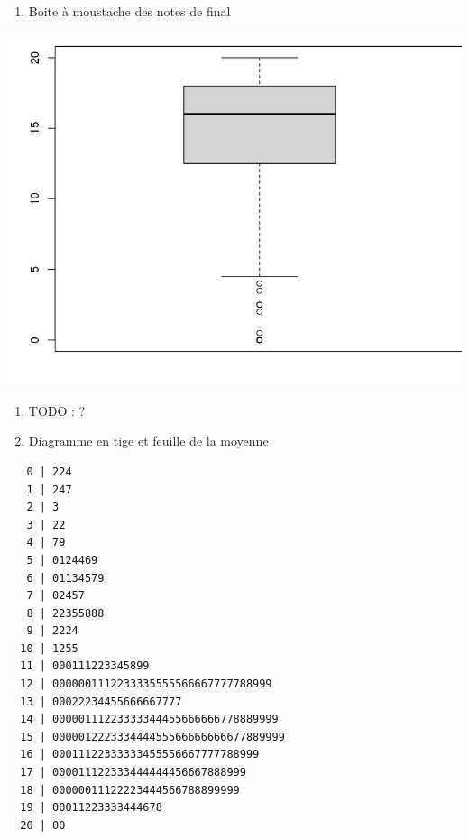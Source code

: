 \documentclass[
]{article}
\newenvironment{Shaded}{}{}
\newcommand{\KeywordTok}[1]{\textcolor[rgb]{0.00,0.44,0.13}{\textbf{#1}}}
\newcommand{\NormalTok}[1]{#1}
\newcommand{\OperatorTok}[1]{\textcolor[rgb]{0.40,0.40,0.40}{#1}}
\providecommand{\tightlist}{%
  \setlength{\itemsep}{0pt}\setlength{\parskip}{0pt}}
\begin{document}
\begin{enumerate}
\def\labelenumi{\arabic{enumi}.}
\setcounter{enumi}{21}
\tightlist
\item
  Boite à moustache des notes de final
\end{enumerate}

\begin{Shaded}
\end{Shaded}

\includegraphics{img/boxplot(final).png}

\begin{enumerate}
\def\labelenumi{\arabic{enumi}.}
\setcounter{enumi}{22}
\item
  TODO : ?
\item
  Diagramme en tige et feuille de la moyenne
\end{enumerate}

\begin{Shaded}
\end{Shaded}

\begin{verbatim}
   0 | 224
   1 | 247
   2 | 3
   3 | 22
   4 | 79
   5 | 0124469
   6 | 01134579
   7 | 02457
   8 | 22355888
   9 | 2224
  10 | 1255
  11 | 000111223345899
  12 | 0000001112233335555566667777788999
  13 | 00022234455666667777
  14 | 00000111223333344455666666778889999
  15 | 000001222333444455566666666677889999
  16 | 00011122333333455556667777788999
  17 | 000011122333444444456667888999
  18 | 00000011122223444566788899999
  19 | 00011223333444678
  20 | 00
\end{verbatim}
\end{document}
